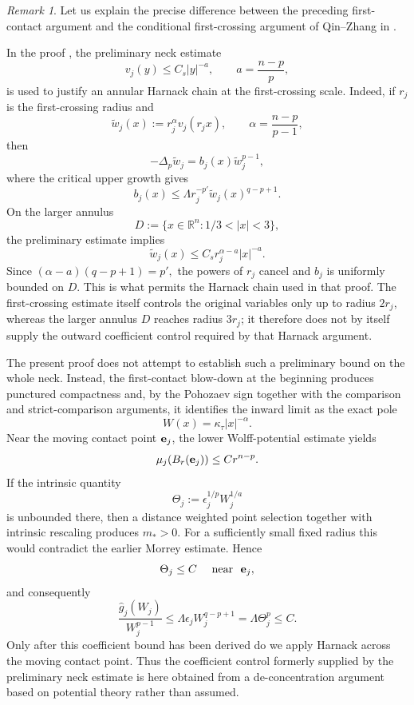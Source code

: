 \documentclass[reqno,12pt]{amsart}
\numberwithin{equation}{section}
\theoremstyle{remark}
\newtheorem{rem}[thm]{Remark}
\newcommand{\R}{\mathbb R}
\begin{document}
\begin{rem}
\label{rem:no-preliminary-neck}
Let us explain the precise difference between the preceding
first-contact argument and the conditional first-crossing argument of Qin--Zhang in \cite{QZ2026}.

In the proof \cite[Lemma~3.7]{QZ2026}, the preliminary neck estimate
$$
v_j(y)\le C_s|y|^{-a},    \qquad    a=\frac{n-p}{p},
$$
is used to justify an annular Harnack chain at the first-crossing scale.  Indeed, if $r_j$ is the first-crossing radius and
$$
\widetilde w_j(x):=r_j^\alpha v_j(r_jx),    \qquad \alpha=\frac{n-p}{p-1},
$$
then
$$
-\Delta_p\widetilde w_j = b_j(x)\widetilde w_j^{p-1},
$$
where the critical upper growth gives
$$
b_j(x) \le \Lambda r_j^{-p'} \widetilde w_j(x)^{q-p+1}.
$$
On the larger annulus
$$
 D:=\{x\in\R^n:1/3<|x|<3\},
$$
the preliminary estimate implies
$$
\widetilde w_j(x)  \le   C_s r_j^{\alpha-a}|x|^{-a}.
$$
Since $(\alpha-a)(q-p+1)=p',$
the powers of $r_j$ cancel and $b_j$ is uniformly bounded on
$D$.  This is what permits the Harnack chain used in that proof.
The first-crossing estimate itself controls the original variables only up to radius $2r_j$, whereas the larger annulus $D$ reaches radius $3r_j$; it therefore does not by itself supply the outward coefficient control required by that Harnack argument.

The present proof does not attempt to establish such a preliminary bound on the whole neck.  Instead, the first-contact blow-down at the beginning produces punctured compactness and, by the Pohozaev sign together with the comparison and strict-comparison arguments, it identifies the inward limit as the exact pole
$$
W(x)=\kappa_\tau|x|^{-\alpha}.
$$
Near the moving contact point ${\bf e}_j$, the lower 
Wolff-potential estimate \cite[Theorem~1.6]{KM1994} yields
$$
\mu_j(B_r({\bf e}_j))\le Cr^{n-p}.
$$
If the intrinsic quantity
$$
\Theta_j:=  \epsilon_j^{1/p}W_j^{1/a}
$$
is unbounded there, then a distance weighted point selection together with intrinsic rescaling produces  $m_*>0$.  For a sufficiently small fixed radius this would
contradict the earlier Morrey estimate.  Hence
$$
    \Theta_j\le C \quad \text{ near }\ {\bf e}_j,
$$
and consequently
$$
\frac{\widehat g_j(W_j)}{W_j^{p-1}} \le \Lambda\epsilon_jW_j^{q-p+1} =\Lambda\Theta_j^p \le C.
$$
Only after this coefficient bound has been derived do we apply
Harnack across the moving contact point.  Thus the coefficient
control formerly supplied by the preliminary neck estimate is here obtained from a de-concentration argument based on potential theory rather than
assumed.
\end{rem}
\end{document}
